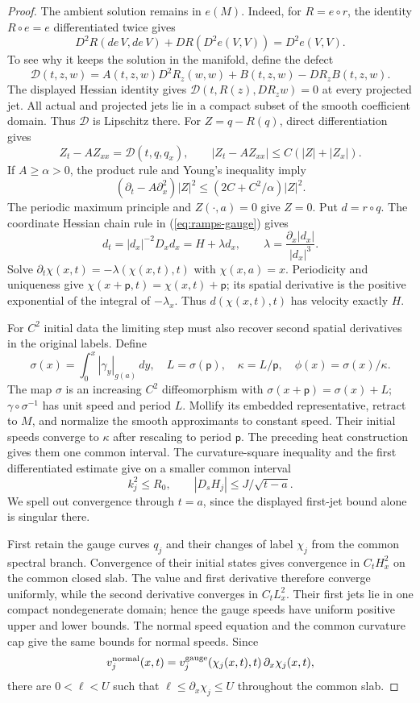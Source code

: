 \begin{proof}
The ambient solution remains in $e(M)$.  Indeed, for $R=e\circ r$, the
identity $R\circ e=e$ differentiated twice gives
\[
 D^2R(de\,V,de\,V)+DR(D^2e(V,V))=D^2e(V,V).
\]
To see why it keeps the solution in the manifold, define the defect
\[
 \mathcal D(t,z,w)=A(t,z,w)D^2R_z(w,w)
                         +B(t,z,w)-DR_z B(t,z,w).
\]
The displayed Hessian identity gives
$\mathcal D(t,R(z),DR_z w)=0$ at every projected jet.
All actual and projected jets lie in a compact subset of the smooth
coefficient domain.  Thus $\mathcal D$ is Lipschitz there.
For $Z=q-R(q)$, direct differentiation gives
\[
 Z_t-A Z_{xx}=\mathcal D(t,q,q_x),\qquad
 |Z_t-A Z_{xx}|\le C(|Z|+|Z_x|).
\]
If $A\ge\alpha>0$, the product rule and Young's inequality imply
\[
 (\partial_t-A\partial_x^2)|Z|^2
 \le (2C+C^2/\alpha)|Z|^2.
\]
The periodic maximum principle and $Z(\cdot,a)=0$ give $Z=0$.
Put $d=r\circ q$.
The coordinate Hessian chain rule in (\ref{eq:ramps-gauge}) gives
\[
 d_t=|d_x|^{-2}D_xd_x=H+\lambda d_x,\qquad
 \lambda=\frac{\partial_x|d_x|}{|d_x|^3}.
\]
Solve $\partial_t\chi(x,t)=-\lambda(\chi(x,t),t)$ with $\chi(x,a)=x$.
Periodicity and uniqueness give $\chi(x+\mathsf p,t)=\chi(x,t)+\mathsf p$;
its spatial derivative is the positive exponential of the integral of
$-\lambda_x$.  Thus $d(\chi(x,t),t)$ has velocity exactly $H$.

For $C^2$ initial data the limiting step must also recover second spatial
derivatives in the original labels.  Define
\[
 \sigma(x)=\int_0^x|\gamma_y|_{g(a)}\,dy,\quad
 L=\sigma(\mathsf p),\quad \kappa=L/\mathsf p,\quad
 \phi(x)=\sigma(x)/\kappa.
\]
The map $\sigma$ is an increasing $C^2$ diffeomorphism with
$\sigma(x+\mathsf p)=\sigma(x)+L$; $\gamma\circ\sigma^{-1}$ has unit
speed and period $L$.  Mollify its embedded representative, retract to $M$,
and normalize the smooth approximants to constant speed.  Their initial
speeds converge to $\kappa$ after rescaling to period $\mathsf p$.
The preceding heat construction gives them one common interval.
The curvature-square inequality and the first differentiated estimate give
on a smaller common interval
\[
 k_j^2\leq R_0,\qquad |D_sH_j|\leq J/\sqrt{t-a}.
\]
We spell out convergence through $t=a$, since the displayed first-jet
bound alone is singular there.

First retain the gauge curves $q_j$ and their changes of label $\chi_j$
from the common spectral branch.  Convergence of their initial states
gives convergence in $C_tH^2_x$ on the common closed slab.
The value and first derivative therefore converge uniformly, while
the second derivative converges in $C_tL^2_x$.
Their first jets lie in one compact nondegenerate domain; hence the
gauge speeds have uniform positive upper and lower bounds.
The normal speed equation and the common curvature cap give the
same bounds for normal speeds.  Since
\[
 v_j^{\rm normal}(x,t)
   =v_j^{\rm gauge}(\chi_j(x,t),t)\,\partial_x\chi_j(x,t),
\]
there are $0<\ell<U$ such that
$\ell\le\partial_x\chi_j\le U$ throughout the common slab.


\end{proof}
